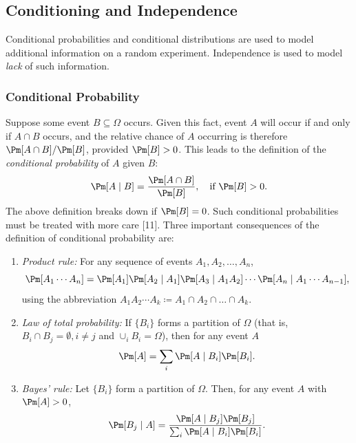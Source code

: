 \subsection{Conditioning and Independence}
Conditional probabilities and conditional distributions are used to model additional information on a random experiment. Independence is used to model \textit{lack} of such information.

\subsubsection{Conditional Probability}
Suppose some event \(B \subseteq \Omega\) occurs. Given this fact, event \(A\) will occur if and only if \(A \cap B\) occurs, and the relative chance of \(A\) occurring is therefore \(\Pm[A \cap B] / \Pm[B]\), provided \(\Pm[B] > 0\). This leads to the definition of the \textit{conditional probability} of \(A\) given \(B\):
\begin{equation}
	\Pm[A \mid B] = \frac{\Pm[A \cap B]}{\Pm[B]}, \quad \text{if } \Pm[B] > 0. \label{eq:ConditionalProbability}
\end{equation}
The above definition breaks down if \(\Pm[B] = 0\). Such conditional probabilities must be treated with more care [11].
Three important consequences of the definition of conditional probability are:
\begin{enumerate}
	\item \textit{Product rule:} For any sequence of events \(A_1, A_2, \dots, A_n\),
	      \begin{equation}
		      \Pm[A_1 \cdots A_n] = \Pm[A_1] \Pm[A_2 \mid A_1] \Pm[A_3 \mid A_1 A_2] \cdots \Pm[A_n \mid A_1 \cdots A_{n-1}], \label{eq:ProductRule}
	      \end{equation}
	      using the abbreviation \(A_1 A_2 \cdots A_k \coloneqq A_1 \cap A_2 \cap \dots \cap A_k\).
	\item \textit{Law of total probability:} If \(\{B_i\}\) forms a partition of \(\Omega\) (that is, \(B_i \cap B_j = \emptyset, i \neq j\) and \(\cup_i B_i = \Omega\)), then for any event \(A\)
	      \begin{equation}
		      \Pm[A] = \sum_i \Pm[A \mid B_i] \Pm[B_i]. \label{eq:TotalProbability}
	      \end{equation}
	\item \textit{Bayes' rule:} Let \(\{B_i\}\) form a partition of \(\Omega\). Then, for any event \(A\) with \(\Pm[A] > 0\),
	      \begin{equation}
		      \Pm[B_j \mid A] = \frac{\Pm[A \mid B_j] \Pm[B_j]}{\sum_i \Pm[A \mid B_i] \Pm[B_i]}. \label{eq:BayesRule}
	      \end{equation}
\end{enumerate}

